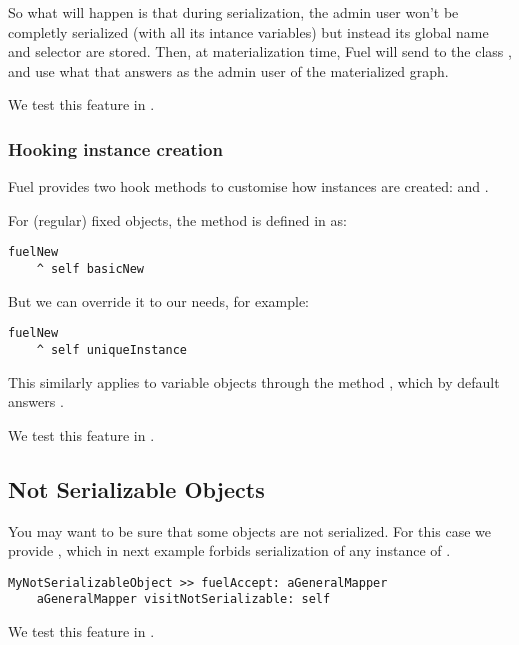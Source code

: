 \documentclass[a4paper,10pt,twoside]{book}
\begin{document}
So what will happen is that during serialization, the admin user won't be completly serialized (with all its intance variables) but instead its global name and selector are stored. Then, at materialization time, Fuel will send  to the class , and use what that answers as the admin user of the materialized graph. 

We test this feature in .

\subsubsection{Hooking instance creation}

Fuel provides two hook methods to customise how instances are created:  and .

For (regular) fixed objects, the method  is defined in  as:

\begin{lstlisting}
fuelNew
	^ self basicNew
\end{lstlisting}

But we can override it to our needs, for example:

\begin{lstlisting}
fuelNew
	^ self uniqueInstance
\end{lstlisting}

This similarly applies to variable objects through the method , which by default answers .

We test this feature in .

\subsection{Not Serializable Objects}

You may want to be sure that some objects are not serialized. For this case we provide , which in next example forbids serialization of any instance of .

\begin{lstlisting}
MyNotSerializableObject >> fuelAccept: aGeneralMapper
    aGeneralMapper visitNotSerializable: self
\end{lstlisting}

We test this feature in .
\end{document}
